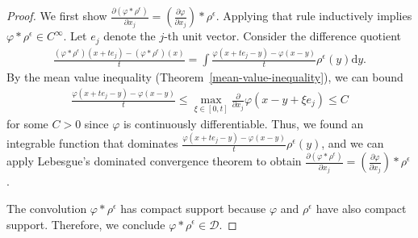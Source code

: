 \begin{proof}
    We first show \(\frac{\partial (\varphi * \rho^{\epsilon})}{\partial x_j} = \left(\frac{\partial \varphi}{\partial x_j}\right) * \rho^{\epsilon}\). Applying that rule inductively implies \(\varphi * \rho^{\epsilon} \in C^{\infty}\). Let \(e_j\) denote the \(j\)-th unit vector. Consider the difference quotient
    \begin{align*}
        \frac{(\varphi * \rho^\epsilon)(x + te_j) - (\varphi * \rho^\epsilon)(x)}{t} = \int \frac{\varphi(x+te_j - y) - \varphi(x-y)}{t}\rho^{\epsilon}(y) \mathrm{d}y.
    \end{align*}
    By the mean value inequality (Theorem~\ref{mean-value-inequality}), we can bound
    \begin{align*}
        \frac{\varphi (x + te_j - y) - \varphi (x-y)}{t} \leq \max_{\xi \in [0,t]}\frac{\partial}{\partial x_j}\varphi(x - y + \xi e_j) \leq C
    \end{align*}
    for some \(C > 0\) since \({\varphi}\) is continuously differentiable. Thus, we found an integrable function that dominates \(\frac{\varphi(x+te_j - y) - \varphi(x-y)}{t}\rho^{\epsilon}(y)\), and we can apply Lebesgue's dominated convergence theorem to obtain \(\frac{\partial (\varphi * \rho^{\epsilon})}{\partial x_j} = \left(\frac{\partial \varphi}{\partial x_j}\right) * \rho^{\epsilon}\).

    The convolution \(\varphi * \rho^{\epsilon}\) has compact support because \({\varphi}\) and \(\rho^{\epsilon}\) have also compact support. Therefore, we conclude \(\varphi * \rho^{\epsilon} \in \mathcal{D}\).


\end{proof}
